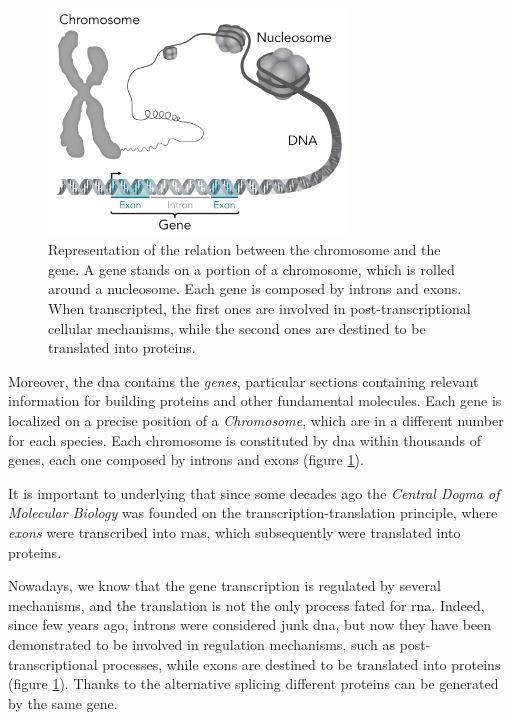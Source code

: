 \begin{figure}[h]
\centering
\includegraphics[width=8cm, keepaspectratio]{img/intro/gene_chrom.png}
\caption[Gene Chromosome relation]{Representation of the relation between the chromosome and the gene. 
A gene stands on a portion of a chromosome, which is rolled around a nucleosome.
Each gene is composed by introns and exons. When transcripted, the first ones are involved in post-transcriptional cellular mechanisms, while the second ones are destined to be translated into proteins.}
\label{fig:dnachromgene}
\end{figure}

Moreover, the \gls{dna} contains the \textit{genes}, particular sections containing relevant information for building proteins and other fundamental molecules.
Each gene is localized on a precise position of a \textit{Chromosome}, which are in a different number for each species.
Each chromosome is constituted by \gls{dna} within thousands of genes, each one composed by introns and exons (figure \ref{fig:dnachromgene}).

It is important to underlying that since some decades ago the \textit{Central Dogma of Molecular Biology} was founded on the transcription-translation principle, where \textit{exons} were transcribed into \gls{rna}s, which subsequently were translated into proteins.

Nowadays, we know that the gene transcription is regulated by several mechanisms, and the translation is not the only process fated for \gls{rna}.
Indeed, since few years ago, introns were considered junk \gls{dna}, but now they have been demonstrated to be involved in regulation mechanisms, such as post-transcriptional processes, while exons are destined to be translated into proteins (figure \ref{fig:dnachromgene}). 
Thanks to the alternative splicing different proteins can be generated by the same gene.


